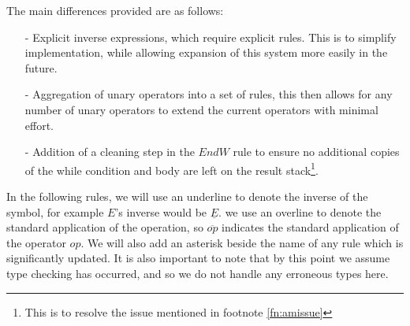 The main differences provided are as follows:
\begin{enumerate} 
    \item[-] Explicit inverse expressions, which require explicit rules. This is to simplify implementation, while allowing expansion of this system more easily in the future.
    \item[-] Aggregation of unary operators into a set of rules, this then allows for any number of unary operators to extend the current operators with minimal effort.
    \item[-] Addition of a cleaning step in the $EndW$ rule to ensure no additional copies of the while condition and body are left on the result stack\footnote{This is to resolve the issue mentioned in footnote \ref{fn:amissue}}.
\end{enumerate}

In the following rules, we will use an underline to denote the inverse of the symbol, for example $E$'s inverse would be $\underline{E}$. we use an overline to denote the standard application of the operation, so $\overline{op}$ indicates the standard application of the operator $op$. We will also add an asterisk beside the name of any rule which is significantly updated. It is also important to note that by this point we assume type checking has occurred, and so we do not handle any erroneous types here.

\newcommand{\astate}[4]{%
    \langle%
    \if\relax\detokenize{#1}\relax c\else #1 \cdot c\fi, %
    \if\relax\detokenize{#2}\relax r\else #2 \cdot r\fi, %
    \if\relax\detokenize{#3}\relax m\else m[#3]\fi, %
    \if\relax\detokenize{#4}\relax b\else #4 \cdot b\fi %
    \rangle%
}

\newcommand{\bstate}[4]{%
    \langle%
    \if\relax\detokenize{#1}\relax c\else #1 \cdot c\fi, %
    \if\relax\detokenize{#2}\relax r\else #2 \cdot r\fi, %
    \if\relax\detokenize{#3}\relax m\else m[#3]\fi, %
    \if\relax\detokenize{#4}\relax b\else #4 \cdot b\fi %
    \rangle%
}

\newcommand{\arule}[1]{\overset{#1}{\to}}

